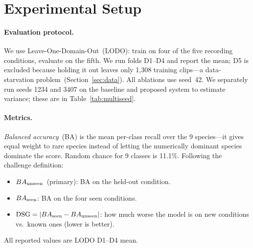 \section{Experimental Setup}
\label{sec:experiments}

\paragraph{Evaluation protocol.}
We use Leave-One-Domain-Out~(LODO): train on four of the five
recording conditions, evaluate on the fifth.
We run folds D1--D4 and report the mean; D5 is excluded because
holding it out leaves only 1,308 training clips---a data-starvation
problem~(Section~\ref{sec:data}).
All ablations use seed~42.
We separately run seeds 1234 and 3407 on the baseline and proposed
system to estimate variance; these are in Table~\ref{tab:multiseed}.

\begin{table}[h]
  \centering
  \caption{LODO D1--D4 mean $\BAu$ across seeds for baseline and
           proposed system. $^\star$D3 fold incomplete; 3-fold mean.}
  \label{tab:multiseed}
  \setlength{\tabcolsep}{5pt}
\end{table}

\paragraph{Metrics.}
\emph{Balanced accuracy}~(BA) is the mean per-class recall over the 9
species---it gives equal weight to rare species instead of letting the
numerically dominant species dominate the score.
Random chance for 9 classes is 11.1\%.
Following the challenge definition:
\begin{itemize}
  \item $\BAu$~(primary): BA on the held-out condition.
  \item $BA_{\text{seen}}$: BA on the four seen conditions.
  \item $\mathrm{DSG} = |BA_{\text{seen}} - BA_{\text{unseen}}|$: how much worse the model is on new
    conditions vs.\ known ones (lower is better).
\end{itemize}
All reported values are LODO D1--D4 mean.


